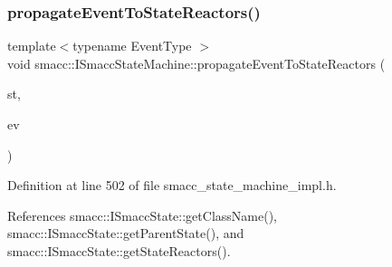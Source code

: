\subsubsection{\texorpdfstring{propagate\+Event\+To\+State\+Reactors()}{propagateEventToStateReactors()}}
{\footnotesize\ttfamily template$<$typename Event\+Type $>$ \\
void smacc\+::\+I\+Smacc\+State\+Machine\+::propagate\+Event\+To\+State\+Reactors (\begin{DoxyParamCaption}\item[{\hyperlink{classsmacc_1_1ISmaccState}{I\+Smacc\+State} $\ast$}]{st,  }\item[{Event\+Type $\ast$}]{ev }\end{DoxyParamCaption})\hspace{0.3cm}{\ttfamily [private]}}



Definition at line 502 of file smacc\+\_\+state\+\_\+machine\+\_\+impl.\+h.



References smacc\+::\+I\+Smacc\+State\+::get\+Class\+Name(), smacc\+::\+I\+Smacc\+State\+::get\+Parent\+State(), and smacc\+::\+I\+Smacc\+State\+::get\+State\+Reactors().


